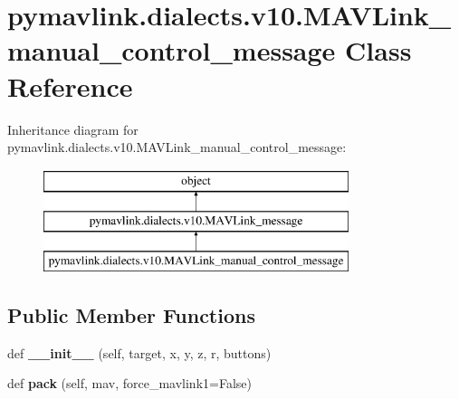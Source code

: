 \hypertarget{classpymavlink_1_1dialects_1_1v10_1_1MAVLink__manual__control__message}{}\section{pymavlink.\+dialects.\+v10.\+M\+A\+V\+Link\+\_\+manual\+\_\+control\+\_\+message Class Reference}
\label{classpymavlink_1_1dialects_1_1v10_1_1MAVLink__manual__control__message}
Inheritance diagram for pymavlink.\+dialects.\+v10.\+M\+A\+V\+Link\+\_\+manual\+\_\+control\+\_\+message\+:\begin{figure}[H]
\begin{center}
\leavevmode
\includegraphics[height=3.000000cm]{classpymavlink_1_1dialects_1_1v10_1_1MAVLink__manual__control__message}
\end{center}
\end{figure}
\subsection*{Public Member Functions}
\begin{DoxyCompactItemize}
\item 
\mbox{\label{classpymavlink_1_1dialects_1_1v10_1_1MAVLink__manual__control__message_a4c812642bc5d0a22f4d825139d384325}} 
def {\bfseries \+\_\+\+\_\+init\+\_\+\+\_\+} (self, target, x, y, z, r, buttons)
\item 
\mbox{\label{classpymavlink_1_1dialects_1_1v10_1_1MAVLink__manual__control__message_a90d9e131591d0e17fc2a6bb98b72ea8c}} 
def {\bfseries pack} (self, mav, force\+\_\+mavlink1=False)
\end{DoxyCompactItemize}
